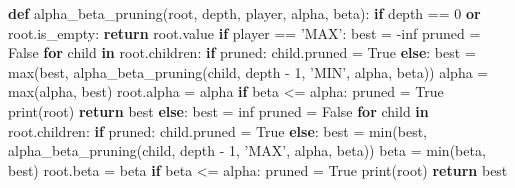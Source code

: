 \documentclass[12pt]{article}
\newenvironment{Shaded}{}{}
\newcommand{\KeywordTok}[1]{\textcolor[rgb]{0.00,0.44,0.13}{\textbf{{#1}}}}
\newcommand{\DecValTok}[1]{\textcolor[rgb]{0.25,0.63,0.44}{{#1}}}
\newcommand{\StringTok}[1]{\textcolor[rgb]{0.25,0.44,0.63}{{#1}}}
\newcommand{\NormalTok}[1]{{#1}}
\newcommand{\VariableTok}[1]{\textcolor[rgb]{0.10,0.09,0.49}{{#1}}}
\newcommand{\ControlFlowTok}[1]{\textcolor[rgb]{0.00,0.44,0.13}{\textbf{{#1}}}}
\newcommand{\OperatorTok}[1]{\textcolor[rgb]{0.40,0.40,0.40}{{#1}}}
\newcommand{\BuiltInTok}[1]{{#1}}
\begin{document}
\begin{Shaded}
\begin{Highlighting}[]
\KeywordTok{def} \NormalTok{alpha_beta_pruning(root, depth, player, alpha, beta):}
    \ControlFlowTok{if} \NormalTok{depth }\OperatorTok{==} \DecValTok{0} \KeywordTok{or} \NormalTok{root.is_empty:}
        \ControlFlowTok{return} \NormalTok{root.value}
    \ControlFlowTok{if} \NormalTok{player }\OperatorTok{==} \StringTok{'MAX'}\NormalTok{:}
        \NormalTok{best }\OperatorTok{=} \OperatorTok{-}\NormalTok{inf}
        \NormalTok{pruned }\OperatorTok{=} \VariableTok{False}
        \ControlFlowTok{for} \NormalTok{child }\KeywordTok{in} \NormalTok{root.children:}
            \ControlFlowTok{if} \NormalTok{pruned:}
                \NormalTok{child.pruned }\OperatorTok{=} \VariableTok{True}
            \ControlFlowTok{else}\NormalTok{:}
                \NormalTok{best }\OperatorTok{=} \BuiltInTok{max}\NormalTok{(best,}
                           \NormalTok{alpha_beta_pruning(child, depth }\OperatorTok{-} \DecValTok{1}\NormalTok{, }\StringTok{'MIN'}\NormalTok{,}
                                              \NormalTok{alpha, beta))}
                \NormalTok{alpha }\OperatorTok{=} \BuiltInTok{max}\NormalTok{(alpha, best)}
                \NormalTok{root.alpha }\OperatorTok{=} \NormalTok{alpha}
                \ControlFlowTok{if} \NormalTok{beta }\OperatorTok{<=} \NormalTok{alpha:}
                    \NormalTok{pruned }\OperatorTok{=} \VariableTok{True}
        \BuiltInTok{print}\NormalTok{(root)}
        \ControlFlowTok{return} \NormalTok{best}
    \ControlFlowTok{else}\NormalTok{:}
        \NormalTok{best }\OperatorTok{=} \NormalTok{inf}
        \NormalTok{pruned }\OperatorTok{=} \VariableTok{False}
        \ControlFlowTok{for} \NormalTok{child }\KeywordTok{in} \NormalTok{root.children:}
            \ControlFlowTok{if} \NormalTok{pruned:}
                \NormalTok{child.pruned }\OperatorTok{=} \VariableTok{True}
            \ControlFlowTok{else}\NormalTok{:}
                \NormalTok{best }\OperatorTok{=} \BuiltInTok{min}\NormalTok{(best,}
                           \NormalTok{alpha_beta_pruning(child, depth }\OperatorTok{-} \DecValTok{1}\NormalTok{, }\StringTok{'MAX'}\NormalTok{,}
                                              \NormalTok{alpha, beta))}
                \NormalTok{beta }\OperatorTok{=} \BuiltInTok{min}\NormalTok{(beta, best)}
                \NormalTok{root.beta }\OperatorTok{=} \NormalTok{beta}
                \ControlFlowTok{if} \NormalTok{beta }\OperatorTok{<=} \NormalTok{alpha:}
                    \NormalTok{pruned }\OperatorTok{=} \VariableTok{True}
        \BuiltInTok{print}\NormalTok{(root)}
        \ControlFlowTok{return} \NormalTok{best}
\end{Highlighting}
\end{Shaded}
\end{document}
